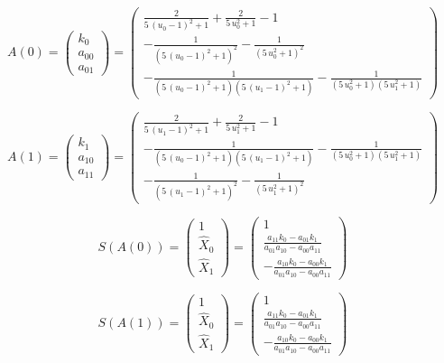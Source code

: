 \documentclass{article}
\begin{document}
\[
  A\left(0\right) = \left(\begin{array}{r}
k_{0} \\
a_{00} \\
a_{01}
\end{array}\right) = \left(\begin{array}{r}
\frac{2}{5 \, {\left(u_{0} - 1\right)}^{2} + 1} + \frac{2}{5 \, u_{0}^{2} + 1} - 1 \\
-\frac{1}{{\left(5 \, {\left(u_{0} - 1\right)}^{2} + 1\right)}^{2}} - \frac{1}{{\left(5 \, u_{0}^{2} + 1\right)}^{2}} \\
-\frac{1}{{\left(5 \, {\left(u_{0} - 1\right)}^{2} + 1\right)} {\left(5 \, {\left(u_{1} - 1\right)}^{2} + 1\right)}} - \frac{1}{{\left(5 \, u_{0}^{2} + 1\right)} {\left(5 \, u_{1}^{2} + 1\right)}}
\end{array}\right)
\]

\[
  A\left(1\right) = \left(\begin{array}{r}
k_{1} \\
a_{10} \\
a_{11}
\end{array}\right) = \left(\begin{array}{r}
\frac{2}{5 \, {\left(u_{1} - 1\right)}^{2} + 1} + \frac{2}{5 \, u_{1}^{2} + 1} - 1 \\
-\frac{1}{{\left(5 \, {\left(u_{0} - 1\right)}^{2} + 1\right)} {\left(5 \, {\left(u_{1} - 1\right)}^{2} + 1\right)}} - \frac{1}{{\left(5 \, u_{0}^{2} + 1\right)} {\left(5 \, u_{1}^{2} + 1\right)}} \\
-\frac{1}{{\left(5 \, {\left(u_{1} - 1\right)}^{2} + 1\right)}^{2}} - \frac{1}{{\left(5 \, u_{1}^{2} + 1\right)}^{2}}
\end{array}\right)
\]

\[
  S\left(A\left(0\right)\right) = \left(\begin{array}{r}
1 \\
\hat{X}_{0} \\
\hat{X}_{1}
\end{array}\right) = \left(\begin{array}{r}
1 \\
\frac{a_{11} k_{0} - a_{01} k_{1}}{a_{01} a_{10} - a_{00} a_{11}} \\
-\frac{a_{10} k_{0} - a_{00} k_{1}}{a_{01} a_{10} - a_{00} a_{11}}
\end{array}\right)
\]

\[
  S\left(A\left(1\right)\right) = \left(\begin{array}{r}
1 \\
\hat{X}_{0} \\
\hat{X}_{1}
\end{array}\right) = \left(\begin{array}{r}
1 \\
\frac{a_{11} k_{0} - a_{01} k_{1}}{a_{01} a_{10} - a_{00} a_{11}} \\
-\frac{a_{10} k_{0} - a_{00} k_{1}}{a_{01} a_{10} - a_{00} a_{11}}
\end{array}\right)
\]
\end{document}

